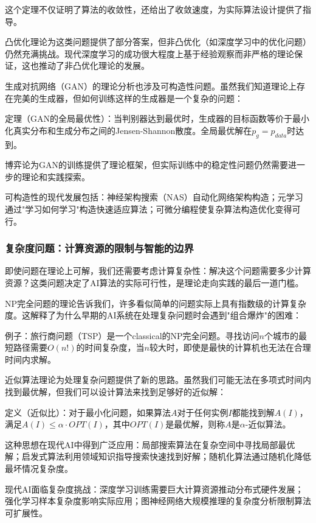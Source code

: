 这个定理不仅证明了算法的收敛性，还给出了收敛速度，为实际算法设计提供了指导。

凸优化理论为这类问题提供了部分答案，但非凸优化（如深度学习中的优化问题）仍然充满挑战。现代深度学习的成功很大程度上基于经验观察而非严格的理论保证，这也推动了非凸优化理论的发展。

生成对抗网络（GAN）的理论分析也涉及可构造性问题。虽然我们知道理论上存在完美的生成器，但如何训练这样的生成器是一个复杂的问题：

定理（GAN的全局最优性）：当判别器达到最优时，生成器的目标函数等价于最小化真实分布和生成分布之间的Jensen-Shannon散度。全局最优解在$p_g = p_{data}$时达到。

博弈论为GAN的训练提供了理论框架，但实际训练中的稳定性问题仍然需要进一步的理论和实践探索。

可构造性的现代发展包括：神经架构搜索（NAS）自动化网络架构构造；元学习通过"学习如何学习"构造快速适应算法；可微分编程使复杂算法构造优化变得可行。

\subsubsection{复杂度问题：计算资源的限制与智能的边界}

即使问题在理论上可解，我们还需要考虑计算复杂性：解决这个问题需要多少计算资源？这类问题决定了AI算法的实际可行性，是理论走向实践的最后一道门槛。

NP完全问题的理论告诉我们，许多看似简单的问题实际上具有指数级的计算复杂度。这解释了为什么早期的AI系统在处理复杂问题时会遇到"组合爆炸"的困难：

例子：旅行商问题（TSP）是一个classical的NP完全问题。寻找访问$n$个城市的最短路径需要$O(n!)$的时间复杂度，当$n$较大时，即使是最快的计算机也无法在合理时间内求解。

近似算法理论为处理复杂问题提供了新的思路。虽然我们可能无法在多项式时间内找到最优解，但我们可以设计算法来找到足够好的近似解：

定义（近似比）：对于最小化问题，如果算法$A$对于任何实例$I$都能找到解$A(I)$，满足$A(I) \leq \alpha \cdot OPT(I)$，其中$OPT(I)$是最优解，则称$A$是$\alpha$-近似算法。

这种思想在现代AI中得到广泛应用：局部搜索算法在复杂空间中寻找局部最优解；启发式算法利用领域知识指导搜索快速找到好解；随机化算法通过随机化降低最坏情况复杂度。

现代AI面临复杂度挑战：深度学习训练需要巨大计算资源推动分布式硬件发展；强化学习样本复杂度影响实际应用；图神经网络大规模推理的复杂度分析限制算法可扩展性。

